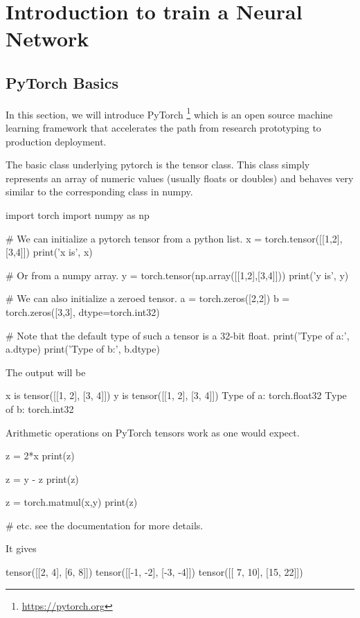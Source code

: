 \section{Introduction to train a Neural Network} %
\subsection{PyTorch Basics} %
In this section, we will introduce PyTorch \footnote{\url{https://pytorch.org}} which is an open source machine learning framework that accelerates the path from research prototyping to production deployment. 

The basic class underlying pytorch is the tensor class. This class simply represents an array of numeric values (usually floats or doubles) and behaves very similar to the corresponding class in numpy.
\begin{python}
import torch
import numpy as np

# We can initialize a pytorch tensor from a python list.
x = torch.tensor([[1,2],[3,4]])
print('x is', x)

# Or from a numpy array.
y = torch.tensor(np.array([[1,2],[3,4]]))
print('y is', y)

# We can also initialize a zeroed tensor.
a = torch.zeros([2,2])
b = torch.zeros([3,3], dtype=torch.int32)

# Note that the default type of such a tensor is a 32-bit float.
print('Type of a:', a.dtype)
print('Type of b:', b.dtype)
\end{python}
The output will be
\begin{python}
x is tensor([[1, 2],
        [3, 4]])
y is tensor([[1, 2],
        [3, 4]])
Type of a: torch.float32
Type of b: torch.int32
\end{python}
Arithmetic operations on PyTorch tensors work as one would expect.
\begin{python}
z = 2*x
print(z)

z = y - z
print(z)

z = torch.matmul(x,y)
print(z)

# etc. see the documentation for more details.
\end{python}
It gives
\begin{python}
tensor([[2, 4],
        [6, 8]])
tensor([[-1, -2],
        [-3, -4]])
tensor([[ 7, 10],
        [15, 22]])
\end{python}


